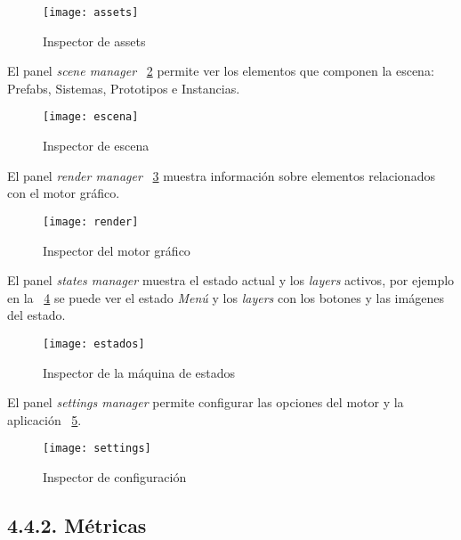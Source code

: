 \begin{figure}[h!]
    \centering
    \texttt{[image: assets]}
    \caption{Inspector de assets}
    \label{assets_inspector}
\end{figure}

El panel \textit{scene manager} \figurename~\ref{scene_inspector} 
permite ver los elementos que componen la escena: Prefabs, Sistemas, Prototipos e Instancias.

\begin{figure}[h!]
    \centering
    \texttt{[image: escena]}
    \caption{Inspector de escena}
    \label{scene_inspector}
\end{figure}

\newpage
El panel \textit{render manager} \figurename~\ref{render_inspector} 
muestra información sobre elementos relacionados con el motor gráfico.

\begin{figure}[h!]
    \centering
    \texttt{[image: render]}
    \caption{Inspector del motor gráfico}
    \label{render_inspector}
\end{figure}

El panel \textit{states manager} muestra el estado actual y los \textit{layers} activos, por ejemplo en la \figurename~\ref{states_inspector}
se puede ver el estado \textit{Menú} y los \textit{layers} con los botones y las imágenes del estado.

\begin{figure}[h!]
    \centering
    \texttt{[image: estados]}
    \caption{Inspector de la máquina de estados}
    \label{states_inspector}
\end{figure}

\newpage
\vfill

El panel \textit{settings manager} permite configurar las opciones del motor y la aplicación \figurename~\ref{settings_inspector}.

\begin{figure}[h!]
    \centering
    \texttt{[image: settings]}
    \caption{Inspector de configuración}
    \label{settings_inspector}
\end{figure}

\subsection*{4.4.2. Métricas}\label{sec:workflow_debugger_metrics}

